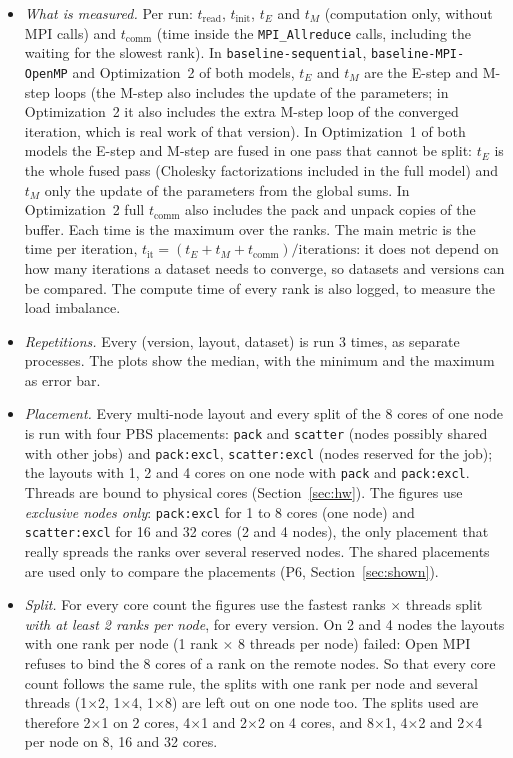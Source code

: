 \documentclass[conference,onecolumn]{IEEEtran}
\newcommand{\vseq}{\texttt{baseline-\allowbreak sequential}}
\newcommand{\vbase}{\texttt{baseline-\allowbreak MPI-\allowbreak OpenMP}}
\begin{document}
\begin{itemize}
\item \emph{What is measured.} Per run: $t_{\mathrm{read}}$, $t_{\mathrm{init}}$, $t_E$ and $t_M$ (computation only, without MPI calls) and $t_{\mathrm{comm}}$ (time inside the \texttt{MPI\_Allreduce} calls, including the waiting for the slowest rank). In \vseq{}, \vbase{} and Optimization~2 of both models, $t_E$ and $t_M$ are the E-step and M-step loops (the M-step also includes the update of the parameters; in Optimization~2 it also includes the extra M-step loop of the converged iteration, which is real work of that version). In Optimization~1 of both models the E-step and M-step are fused in one pass that cannot be split: $t_E$ is the whole fused pass (Cholesky factorizations included in the full model) and $t_M$ only the update of the parameters from the global sums. In Optimization~2 full $t_{\mathrm{comm}}$ also includes the pack and unpack copies of the buffer. Each time is the maximum over the ranks. The main metric is the time per iteration, $t_{\mathrm{it}}=(t_E+t_M+t_{\mathrm{comm}})/\text{iterations}$: it does not depend on how many iterations a dataset needs to converge, so datasets and versions can be compared. The compute time of every rank is also logged, to measure the load imbalance.
\item \emph{Repetitions.} Every (version, layout, dataset) is run 3 times, as separate processes. The plots show the median, with the minimum and the maximum as error bar.
\item \emph{Placement.} Every multi-node layout and every split of the 8 cores of one node is run with four PBS placements: \texttt{pack} and \texttt{scatter} (nodes possibly shared with other jobs) and \texttt{pack:excl}, \texttt{scatter:excl} (nodes reserved for the job); the layouts with 1, 2 and 4 cores on one node with \texttt{pack} and \texttt{pack:excl}. Threads are bound to physical cores (Section~\ref{sec:hw}). The figures use \emph{exclusive nodes only}: \texttt{pack:excl} for 1 to 8 cores (one node) and \texttt{scatter:excl} for 16 and 32 cores (2 and 4 nodes), the only placement that really spreads the ranks over several reserved nodes. The shared placements are used only to compare the placements (P6, Section~\ref{sec:shown}).
\item \emph{Split.} For every core count the figures use the fastest ranks $\times$ threads split \emph{with at least 2 ranks per node}, for every version. On 2 and 4 nodes the layouts with one rank per node (1 rank $\times$ 8 threads per node) failed: Open MPI refuses to bind the 8 cores of a rank on the remote nodes. So that every core count follows the same rule, the splits with one rank per node and several threads (1$\times$2, 1$\times$4, 1$\times$8) are left out on one node too. The splits used are therefore 2$\times$1 on 2 cores, 4$\times$1 and 2$\times$2 on 4 cores, and 8$\times$1, 4$\times$2 and 2$\times$4 per node on 8, 16 and 32 cores.

\end{itemize}
\end{document}

